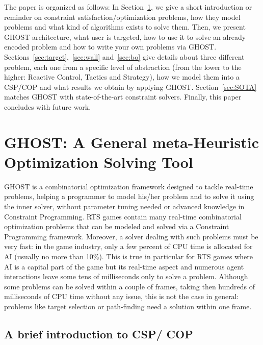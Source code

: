 \documentclass[journal]{IEEEtran}
\newcommand{\csp}{\textsc{CSP}\xspace}
\newcommand{\cop}{\textsc{COP}\xspace}
\newcommand{\ghost}{\textsc{GHOST}\xspace}
\begin{document}
The paper is organized as follows: In Section~\ref{sec:ghost}, we give
a     short     introduction     or     reminder     on     constraint
satisfaction/optimization problems,  how they model problems  and what
kind  of algorithms  exists to  solve them.   Then, we  present \ghost
architecture, what user is targeted, how  to use it to  solve an already
encoded  problem  and how  to  write  your  own problems  via  \ghost.
Sections~\ref{sec:target},~\ref{sec:wall}     and~\ref{sec:bo}    give
details about three  different problem, each one from a  specific level of
abstraction (from  the lower to  the higher: Reactive  Control, Tactics
and Strategy), how  we model them into a \csp/\cop  and what results
we obtain by applying  \ghost. Section~\ref{sec:SOTA} matches \ghost
with  state-of-the-art   constraint  solvers.   Finally,   this  paper
concludes with future work.

\section{\ghost:   A  General   meta-Heuristic  Optimization   Solving
  Tool}\label{sec:ghost}

\ghost is a combinatorial  optimization framework designed to tackle real-time problems, helping a programmer to model his/her problem and to solve it using the inner solver, without parameter tuning needed or advanced knowledge in Constraint Programming. RTS games contain many real-time combinatorial optimization problems that can be modeled and solved via a Constraint Programming framework. Moreover, a solver dealing with such problems must be very fast: in the game industry, only a few percent of CPU time is allocated for AI (usually no more than 10\%). This is true in particular for RTS games where AI is a capital part of the game but its real-time aspect and numerous agent interactions  leave some tens of milliseconds only to solve a problem. Although some problems can be solved within a couple of frames, taking then hundreds of milliseconds of CPU time without any issue, this is not the case in general: problems like target selection or path-finding need a solution within one frame.


\subsection{A brief introduction to \csp / \cop}
\end{document}

